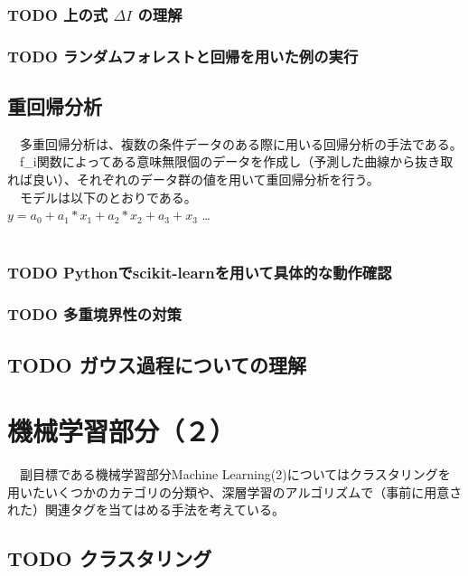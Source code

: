 \documentclass{scrartcl}
\begin{document}
\subsubsection{{\bfseries\sffamily TODO} 上の式 \(\Delta I\) の理解}
\label{sec:org5d603f1}
\subsubsection{{\bfseries\sffamily TODO} ランダムフォレストと回帰を用いた例の実行}
\label{sec:orgad7b878}
\subsection{重回帰分析}
\label{sec:org654fa01}
　多重回帰分析は、複数の条件データのある際に用いる回帰分析の手法である。\\
　f\_i関数によってある意味無限個のデータを作成し（予測した曲線から抜き取れば良い）、それぞれのデータ群の値を用いて重回帰分析を行う。\\
　モデルは以下のとおりである。\\
\(y = a_0 + a_1 * x_1 + a_2 * x_2 + a_3 + x_3\) \ldots{}\\
　\\
\subsubsection{{\bfseries\sffamily TODO} Pythonでscikit-learnを用いて具体的な動作確認 \cite{linerReggression}}
\label{sec:org47f0f04}
\subsubsection{{\bfseries\sffamily TODO} 多重境界性の対策}
\label{sec:orgd09c42b}
\subsection{{\bfseries\sffamily TODO} ガウス過程についての理解}
\label{sec:org5965963}
\section{機械学習部分（２）}
\label{sec:org9e61be5}
　副目標である機械学習部分Machine Learning(2)についてはクラスタリングを用いたいくつかのカテゴリの分類や、深層学習のアルゴリズムで（事前に用意された）関連タグを当てはめる手法を考えている。\\
\subsection{{\bfseries\sffamily TODO} クラスタリング}
\label{sec:orgc149466}
\end{document}
